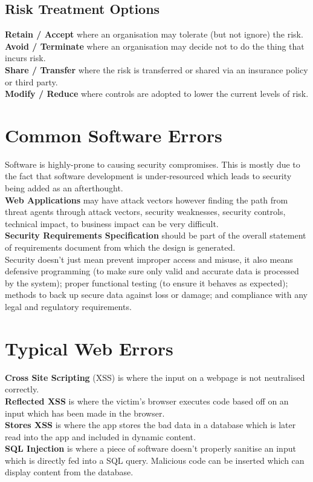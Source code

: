 \documentclass[a4paper,11pt]{article}
\begin{document}
\subsection{Risk Treatment Options}
\textbf{Retain / Accept} where an organisation may tolerate (but not ignore) the risk.\\
\textbf{Avoid / Terminate} where an organisation may decide not to do the thing that incurs risk.\\
\textbf{Share / Transfer} where the risk is transferred or shared via an insurance policy or third party.\\
\textbf{Modify / Reduce} where controls are adopted to lower the current levels of risk.

\section{Common Software Errors}
Software is highly-prone to causing security compromises. This is mostly due to the fact that software development is under-resourced which leads to security being added as an afterthought.\\
\textbf{Web Applications} may have attack vectors however finding the path from threat agents through attack vectors, security weaknesses, security controls, technical impact, to business impact can be very difficult.\\
\textbf{Security Requirements Specification} should be part of the overall statement of requirements document from which the design is generated.\\
Security doesn't just mean prevent improper access and misuse, it also means defensive programming (to make sure only valid and accurate data is processed by the system); proper functional testing (to ensure it behaves as expected); methods to back up secure data against loss or damage; and compliance with any legal and regulatory requirements.

\section{Typical Web Errors}
\textbf{Cross Site Scripting} (XSS) is where the input on a webpage is not neutralised correctly.\\
\textbf{Reflected XSS} is where the victim's browser executes code based off on an input which has been made in the browser.\\
\textbf{Stores XSS} is where the app stores the bad data in a database which is later read into the app and included in dynamic content.\\
\textbf{SQL Injection} is where a piece of software doesn't properly sanitise an input which is directly fed into a SQL query. Malicious code can be inserted which can display content from the database.
\end{document}

